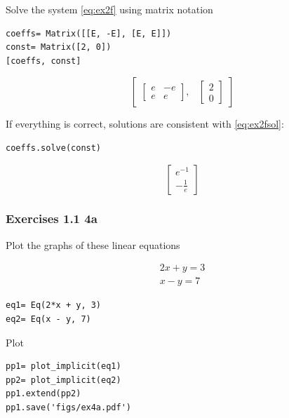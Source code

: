 \documentclass[a4paper]{article}
\begin{document}
Solve the system \ref{eq:ex2f} using matrix notation

\begin{verbatim}
coeffs= Matrix([[E, -E], [E, E]])
const= Matrix([2, 0])
[coeffs, const]
\end{verbatim}

\begin{equation}\label{eq:na}
\begin{bmatrix}\left[\begin{matrix}e & - e\\e & e\end{matrix}\right], & \left[\begin{matrix}2\\0\end{matrix}\right]\end{bmatrix}
\end{equation}

If everything is correct, solutions are consistent with \ref{eq:ex2fsol}:

\begin{verbatim}
coeffs.solve(const)
\end{verbatim}

\begin{equation}
\left[\begin{matrix}e^{-1}\\- \frac{1}{e}\end{matrix}\right]
\end{equation}

\subsubsection{Exercises 1.1 4a}
Plot the graphs of these linear equations

\begin{equation}\label{eq:na}
\begin{matrix}2 x + y = 3\\x - y = 7\end{matrix}
\end{equation}

\begin{verbatim}
eq1= Eq(2*x + y, 3)
eq2= Eq(x - y, 7)
\end{verbatim}

Plot

\begin{verbatim}
pp1= plot_implicit(eq1)
pp2= plot_implicit(eq2)
pp1.extend(pp2)
pp1.save('figs/ex4a.pdf')
\end{verbatim}
\end{document}
